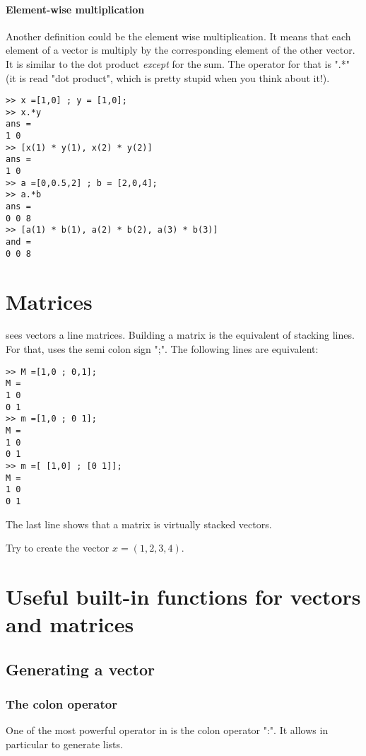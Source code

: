 \paragraph{Element-wise multiplication}
Another definition could be the element wise multiplication.
It means that each element of a vector is multiply by the corresponding element of the other vector.
It is similar to the dot product \emph{except} for the sum.
The operator for that is ".*" (it is read "dot product", which is pretty stupid when you think about it!).

\begin{lstlisting}
>> x =[1,0] ; y = [1,0];
>> x.*y
ans = 
1 0
>> [x(1) * y(1), x(2) * y(2)]
ans =
1 0
>> a =[0,0.5,2] ; b = [2,0,4];
>> a.*b
ans = 
0 0 8
>> [a(1) * b(1), a(2) * b(2), a(3) * b(3)]
and =
0 0 8
\end{lstlisting}





\section{Matrices}
\matlab sees vectors a line matrices. Building a matrix is the equivalent of stacking lines.
For that, \matlab uses the semi colon sign ";".
The following lines are equivalent:
\begin{lstlisting}
>> M =[1,0 ; 0,1];
M = 
1 0
0 1
>> m =[1,0 ; 0 1];
M = 
1 0
0 1
>> m =[ [1,0] ; [0 1]];
M = 
1 0
0 1
\end{lstlisting}

The last line shows that a matrix is virtually stacked vectors.



Try to create the vector $x = (1,2,3,4)$.




\section{Useful built-in functions for vectors and matrices}
\subsection{Generating a vector}

\subsubsection{The colon operator}
\label{sssec-colon}
One of the most powerful operator in \matlab is the colon operator ":".
It allows in particular to generate lists.


